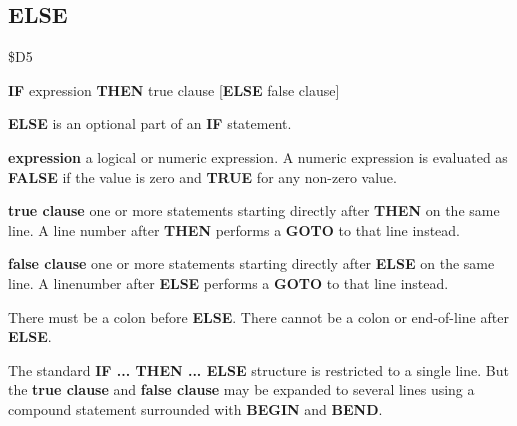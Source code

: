 \subsection{ELSE}
\begin{description}[leftmargin=2cm,style=nextline]
\item [Token:] \$D5
\item [Format:] {\bf IF} expression {\bf THEN} true clause
		[{\bf ELSE} false clause]
\item [Usage:] {\bf ELSE} is an optional part of an {\bf IF}
               statement.

               {\bf expression} a logical or numeric expression.
               A numeric expression is evaluated as {\bf FALSE}
               if the value is zero and {\bf TRUE} for any non-zero
               value.

               {\bf true clause} one or more statements starting
               directly after {\bf THEN} on the same line.
               A line number after {\bf THEN} performs a
               {\bf GOTO} to that line instead.

               {\bf false clause} one or more statements starting
               directly after {\bf ELSE} on the same line.
               A linenumber after {\bf ELSE} performs a
               {\bf GOTO} to that line instead.

\item [Remarks:]
               There must be a colon before {\bf ELSE}.
               There cannot be a colon or end-of-line after {\bf ELSE}.

               The standard {\bf IF ... THEN ... ELSE} structure
               is restricted to a single line. But the {\bf true clause}
               and {\bf false clause} may be expanded to several lines
               using a compound statement surrounded with
               {\bf BEGIN} and {\bf BEND}.


\end{description}
